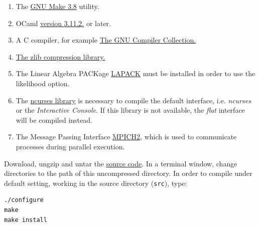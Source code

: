 \begin{enumerate}
\item The \href{http://www.gnu.org/software/make/}{GNU Make 3.8} utility. 
\item OCaml \href{http://www.ocaml.org}{version 3.11.2.} or later. 
\item A C compiler, for example \href{http://gcc.gnu.org/} {The GNU Compiler Collection.}
\item \href{http://www.zlib.net}{The zlib compression library.}
\item The Linear Algebra PACKage \href {http://www.netlib.org/lapack/}{LAPACK} must be installed in order to 
use the likelihood option.
\item The \href{http://www.gnu.org/s/ncurses} {ncurses library} is necessary to compile the default interface, 
i.e. \emph{ncurses} or the \emph{Interactive Console}. If this library is not available, the \emph{flat} interface will be 
compiled instead.
\item The Message Passing Interface \href{http://www-unix.mcs.anl.gov/mpi/}{MPICH2}, which is used to communicate 
processes during parallel execution.
\end{enumerate}
Download, ungzip and untar the
\href{http://www.amnh.org/our-research/computational-sciences/research/projects/systematic-biology/poy/download}{\poy source code}.  
In a terminal window, change directories to the path of this uncompressed directory.  
In order to compile under default setting, working in the source directory (\texttt{src}), type:
\begin{verbatim}
./configure
make
make install
\end{verbatim}

